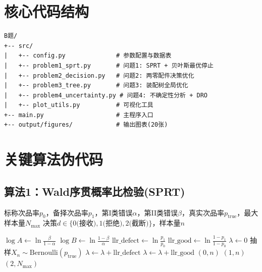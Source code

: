 \documentclass[12pt,a4paper]{ctexart}
\begin{document}
\newpage
\appendix
\section{核心代码结构}

\begin{verbatim}
B题/
+-- src/
|   +-- config.py              # 参数配置与数据表
|   +-- problem1_sprt.py       # 问题1: SPRT + 贝叶斯最优停止
|   +-- problem2_decision.py   # 问题2: 两零配件决策优化
|   +-- problem3_tree.py       # 问题3: 装配树全局优化
|   +-- problem4_uncertainty.py # 问题4: 不确定性分析 + DRO
|   +-- plot_utils.py          # 可视化工具
+-- main.py                    # 主程序入口
+-- output/figures/            # 输出图表(20张)
\end{verbatim}

\section{关键算法伪代码}

\subsection{算法1：Wald序贯概率比检验(SPRT)}

\begin{algorithm}[H]
\caption{Wald SPRT单次试验}
\begin{algorithmic}[1]
\Require 标称次品率$p_0$，备择次品率$p_1$，第I类错误$\alpha$，第II类错误$\beta$，真实次品率$p_{\text{true}}$，最大样本量$N_{\max}$
\Ensure 决策$d \in \{0\text{(接收)}, 1\text{(拒绝)}, 2\text{(截断)}\}$，样本量$n$

\State $\log A \leftarrow \ln\frac{\beta}{1-\alpha}$ 
\State $\log B \leftarrow \ln\frac{1-\beta}{\alpha}$ 
\State $\text{llr\_defect} \leftarrow \ln\frac{p_1}{p_0}$ 
\State $\text{llr\_good} \leftarrow \ln\frac{1-p_1}{1-p_0}$ 
\State $\lambda \leftarrow 0$
    \State 抽样$X_n \sim \text{Bernoulli}(p_{\text{true}})$
        \State $\lambda \leftarrow \lambda + \text{llr\_defect}$
    \Else
        \State $\lambda \leftarrow \lambda + \text{llr\_good}$
    \EndIf
        \State \Return $(0, n)$ 
        \State \Return $(1, n)$ 
    \EndIf
\EndFor
\State \Return $(2, N_{\max})$ 
\end{algorithmic}
\end{algorithm}
\end{document}
